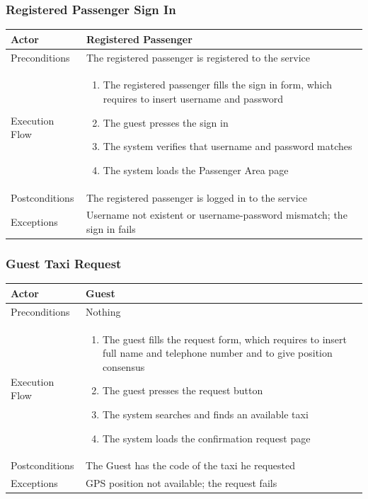 		\subsubsection{Registered Passenger Sign In}
		\begin{center}
			\begin{tabular}{ | l | p{8cm} |}
				\hline
				Actor &  Registered Passenger	\\ \hline
				Preconditions & The registered passenger is registered to the service	\\ \hline
				Execution Flow & \begin{enumerate}
					\item The registered passenger fills the sign in form, which requires to insert username and password
					\item The guest presses the sign in
					\item The system verifies that username and password matches
					\item The system loads the Passenger Area page
				\end{enumerate}		\\ \hline
				Postconditions & The registered passenger is logged in to the service	\\ \hline
				Exceptions & Username not existent or username-password mismatch; the sign in fails \\ \hline
			\end{tabular}
		\end{center}
		\subsubsection{Guest Taxi Request}
		\begin{center}
			\begin{tabular}{ | l | p{8cm} |}
				\hline
				Actor &  Guest	\\ \hline
				Preconditions & Nothing		\\ \hline
				Execution Flow & \begin{enumerate}
					\item The guest fills the request form, which requires to insert full name and telephone number and to give position consensus
					\item The guest presses the request button
					\item The system searches and finds an available taxi
					\item The system loads the confirmation request page
				\end{enumerate}		\\ \hline
				Postconditions & The Guest has the code of the taxi he requested	\\ \hline
				Exceptions & GPS position not available; the request fails \\ \hline
			\end{tabular}
		\end{center}
